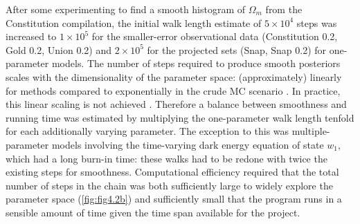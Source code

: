 After some experimenting to find a smooth histogram of $\Omega_m$ from the Constitution compilation, the initial walk length estimate of $5 \times 10^4$ steps was increased to $1 \times 10^5$ for the smaller-error observational data (Constitution 0.2, Gold 0.2, Union 0.2) and $2 \times 10^5$ for the projected sets (Snap, Snap 0.2) for one-parameter models. The number of steps required to produce smooth posteriors scales with the dimensionality of the parameter space: (approximately) linearly for \mcmc{} methods \cite{Dunkley2005} compared to exponentially in the crude MC scenario \cite{Christensen2001}. In practice, this linear scaling is not achieved \cite{Christensen2001,Dunkley2005,LewisBridle2002}. Therefore a balance between smoothness and running time was estimated by multiplying the one-parameter walk length tenfold for each additionally varying parameter. The exception to this was multiple-parameter models involving the time-varying dark energy equation of state $w_1$, which had a long burn-in time: these walks had to be redone with twice the existing steps for smoothness. Computational efficiency required that the total number of steps in the chain was both sufficiently large to widely explore the parameter space (\cref{fig:fig4.2b}) and sufficiently small that the program runs in a sensible amount of time given the time span available for the project. 


